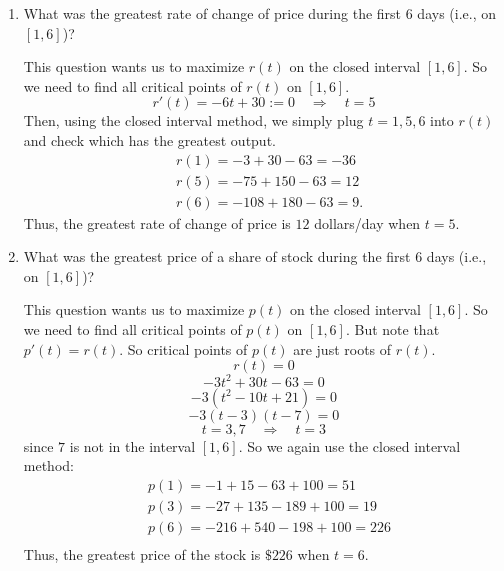 \documentclass[nooutcomes]{ximera}
\begin{document}
\begin{problem}
\begin{enumerate}
		
		
	
	\item  What was the greatest rate of change of price during the first $6$ days (i.e., on $[1,6]$)?  
		\begin{freeResponse}
		This question wants us to maximize $r(t)$ on the closed interval $[1,6]$.  
		So we need to find all critical points of $r(t)$ on $[1,6]$.  
		$$ r'(t) = -6t+30:=0 \quad \Longrightarrow \quad t=5  $$
		Then, using the closed interval method, we simply plug $t=1,5,6$ into $r(t)$ and check which has the greatest output.  
			\begin{align*}
			&r(1) = -3+30-63=-36  \\
			&r(5) = -75+150-63=12  \\
			&r(6) = -108+180-63=9.
			\end{align*}
		Thus, the greatest rate of change of price is $12$ dollars/day when $t=5$.  
		\end{freeResponse}
		
		
		
	
	\item  What was the greatest price of a share of stock during the first $6$ days (i.e., on $[1,6]$)?  
		\begin{freeResponse}
		This question wants us to maximize $p(t)$ on the closed interval $[1,6]$.  
		So we need to find all critical points of $p(t)$ on $[1,6]$. 
		But note that $p'(t) = r(t)$.  So critical points of $p(t)$ are just roots of $r(t)$.  
		$$ r(t) = 0 $$
		$$ -3t^2+30t-63 = 0 $$
		$$ -3(t^2-10t+21)=0 $$
		$$ -3(t-3)(t-7) = 0 $$
		$$ t=3,7 \quad \Longrightarrow \quad t=3 $$
		since $7$ is not in the interval $[1,6]$.  
		So we again use the closed interval method:
			\begin{align*}
			&p(1) = -1+15-63+100 = 51  \\
			&p(3) = -27 + 135 - 189 + 100 = 19  \\
			&p(6) = -216+540-198+100=226  \\
			\end{align*}
		Thus, the greatest price of the stock is $\$226$ when $t=6$.  
		\end{freeResponse}
		
		
		
	
	\end{enumerate}


\end{problem}



	
	
	
	
\end{document}
